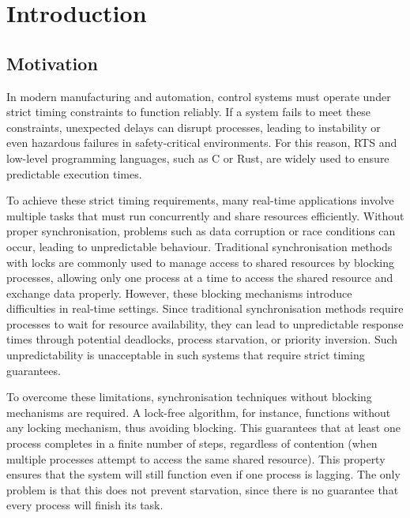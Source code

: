 \chapter{Introduction}\label{ch:introduction}

\section{Motivation}\label{sec:motivation}

In modern manufacturing and automation, control systems must operate under strict timing constraints to function reliably. If a system fails to meet these constraints, unexpected delays can disrupt processes, leading to instability or even hazardous failures in safety-critical environments. For this reason, \ac{RTS} and low-level programming languages, such as C or Rust, are widely used to ensure predictable execution times.

To achieve these strict timing requirements, many real-time applications involve multiple tasks that must run concurrently and share resources efficiently. Without proper synchronisation, problems such as data corruption or race conditions can occur, leading to unpredictable behaviour. Traditional synchronisation methods with locks are commonly used to manage access to shared resources by blocking processes, allowing only one process at a time to access the shared resource and exchange data properly. However, these blocking mechanisms introduce difficulties in real-time settings. Since traditional synchronisation methods require processes to wait for resource availability, they can lead to unpredictable response times through potential deadlocks, process starvation, or priority inversion. Such unpredictability is unacceptable in such systems that require strict timing guarantees. \cite{herlihy1991wait, brandenburg2019multiprocessorrealtimelockingprotocols, kode2024analysisSynchronization}

To overcome these limitations, synchronisation techniques without blocking mechanisms are required. A lock-free algorithm, for instance, functions without any locking mechanism, thus avoiding blocking. This guarantees that at least one process completes in a finite number of steps, regardless of contention (when multiple processes attempt to access the same shared resource). This property ensures that the system will still function even if one process is lagging. The only problem is that this does not prevent starvation, since there is no guarantee that every process will finish its task. \cite{kogan2012methodology}

